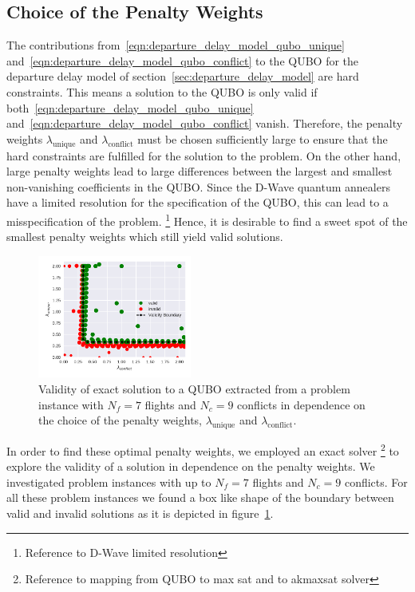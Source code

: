 \subsection{Choice of the Penalty Weights}
The contributions from~\eqref{eqn:departure_delay_model_qubo_unique} and~\eqref{eqn:departure_delay_model_qubo_conflict} to the QUBO for the departure delay model of section~\ref{sec:departure_delay_model} are hard constraints.
This means a solution to the QUBO is only valid if both~\eqref{eqn:departure_delay_model_qubo_unique} and~\eqref{eqn:departure_delay_model_qubo_conflict} vanish.
Therefore, the penalty weights $\lambda_\text{unique}$ and $\lambda_\text{conflict}$ must be chosen sufficiently large to ensure that the hard constraints are fulfilled for the solution to the problem.
On the other hand, large penalty weights lead to large differences between the largest and smallest non-vanishing coefficients in the QUBO.\@
Since the D-Wave quantum annealers have a limited resolution for the specification of the QUBO, this can lead to a misspecification of the problem.
\footnote{Reference to D-Wave limited resolution}
Hence, it is desirable to find a sweet spot of the smallest penalty weights which still yield valid solutions.

\begin{figure}[htpb]
    \centering
    \includegraphics[width=0.45\textwidth]{./pics/validity_boundary_example.pdf}
    \caption{Validity of exact solution to a QUBO extracted from a problem instance with $N_f=7$ flights and $N_c=9$ conflicts in dependence on the choice of the penalty weights, $\lambda_\text{unique}$ and $\lambda_\text{conflict}$.}
\label{fig:penalty_weights}
\end{figure}

In order to find these optimal penalty weights, we employed an exact solver
\footnote{Reference to mapping from QUBO to max sat and to akmaxsat solver} to explore the validity of a solution in dependence on the penalty weights.
We investigated problem instances with up to $N_f=7$ flights and $N_c=9$ conflicts.
For all these problem instances we found a box like shape of the boundary between valid and invalid solutions as it is depicted in figure~\ref{fig:penalty_weights}.

